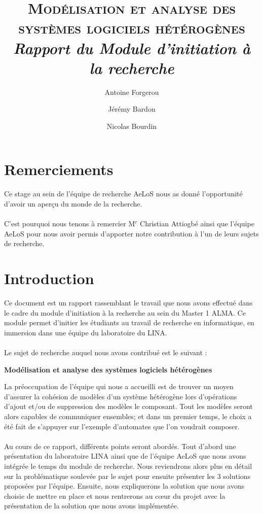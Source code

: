\documentclass[12pt,a4paper]{report}
\title{\textsc{Modélisation et analyse des systèmes logiciels hétérogènes}\vspace{0.5cm}\\\large{\textit{Rapport du Module d'initiation à la recherche}}}
\author{Antoine Forgerou \and Jérémy Bardon \and Nicolas Bourdin}
\date{}
\begin{document}
	\renewcommand{\contentsname}{Sommaire}

	\maketitle	

\chapter*{Remerciements}
Ce stage au sein de l'équipe de recherche AeLoS nous as donné
l'opportunité d'avoir un aperçu du monde de la recherche. 
\\\\
C'est pourquoi nous tenons à remercier M$^r$ Christian Attiogbé 
ainsi que l'équipe AeLoS pour nous avoir permis d'apporter notre
contribution à l'un de leurs sujets de recherche.

\newpage

	\tableofcontents	
	\newpage

	\setlength{\unitlength}{1cm}
	\setcounter{page}{1}
		
\chapter{Introduction}
Ce document est un rapport rassemblant le travail que nous avons effectué dans le cadre du module 
d'initiation à la recherche au sein du Master 1 ALMA. Ce module permet d'initier 
les étudiants au travail de recherche en informatique, en immersion dans une équipe
du laboratoire du LINA. 
\\\\
Le sujet de recherche auquel nous avons contribué est le suivant : 

\begin{center}
	  \textbf{Modélisation et analyse des systèmes logiciels hétérogènes}
\end{center}

La préoccupation de l'équipe qui nous a accueilli est de trouver un moyen d'assurer la cohésion 
de modèles d'un système
hétérogène lors d'opérations d'ajout et/ou de suppression des modèles le composant. 
Tout les modèles seront alors capables de communiquer ensembles; et dans un premier temps, 
le choix a été fait de s'appuyer sur l'exemple d'automates que l'on voudrait composer.
\\\\
Au cours de ce rapport, différents points seront abordés. Tout d'abord une 
présentation du laboratoire LINA ainsi que de l'équipe AeLoS que nous avons intégrée le 
temps du module de recherche. Nous reviendrons alors plus en détail sur la 
problématique soulevée par le sujet pour ensuite présenter les 3 solutions proposées
par l'équipe. Ensuite, nous expliquerons la solution que nous avons choisie de mettre 
en place et nous rentrerons au cœur du projet avec la présentation de la solution
que nous avons implémentée.	
\end{document}
